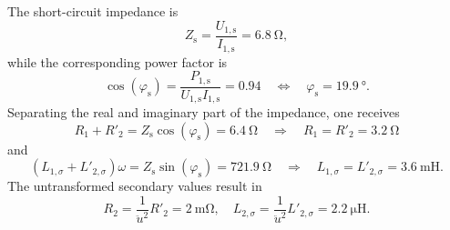 \begin{solutionblock}
	The short-circuit impedance is
	$$
		Z_\mathrm{s} = \frac{U_{\mathrm{1,s}}}{I_{\mathrm{1,s}}} = \SI{6.8}{\ohm},
	$$
	while the corresponding power factor is
	$$
		\cos(\varphi_\mathrm{s}) = \frac{P_{\mathrm{1,s}}}{U_{\mathrm{1,s}}I_{\mathrm{1,s}}} = 0.94 \quad \Leftrightarrow \quad \varphi_\mathrm{s} = \SI{19.9}{\degree}.
	$$
	Separating the real and imaginary part of the impedance, one receives
	$$
		R_1 + R'_2 = Z_\mathrm{s}\cos(\varphi_\mathrm{s}) = \SI{6.4}{\ohm} \quad \Longrightarrow \quad R_1 = R'_2 =  \SI{3.2}{\ohm}
	$$
	and
	$$
		(L_{1,\sigma} + L'_{2,\sigma})\omega = Z_\mathrm{s}\sin(\varphi_\mathrm{s}) = \SI{721.9}{\ohm} \quad \Longrightarrow \quad L_{1,\sigma} = L'_{2,\sigma} =  \SI{3.6}{\milli\henry}.
	$$
	The untransformed secondary values result in
	$$
		R_2 = \frac{1}{\ddot{u}^2} R'_2 = \SI{2}{\milli\ohm}, \quad L_{2,\sigma} = \frac{1}{\ddot{u}^2} L'_{2,\sigma} = \SI{2.2}{\micro\henry}.
	$$
\end{solutionblock}

